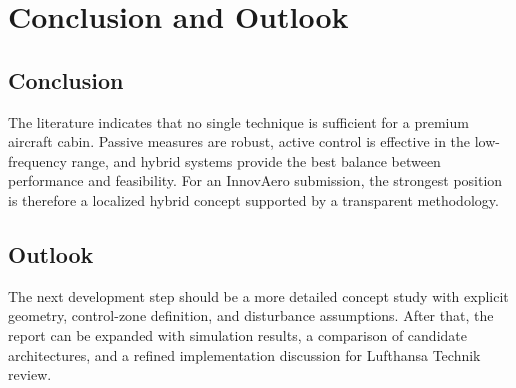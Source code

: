 \chapter{Conclusion and Outlook}

\section{Conclusion}
The literature indicates that no single technique is sufficient for a premium aircraft cabin. Passive measures are robust, active control is effective in the low-frequency range, and hybrid systems provide the best balance between performance and feasibility. For an InnovAero submission, the strongest position is therefore a localized hybrid concept supported by a transparent methodology.

\section{Outlook}
The next development step should be a more detailed concept study with explicit geometry, control-zone definition, and disturbance assumptions. After that, the report can be expanded with simulation results, a comparison of candidate architectures, and a refined implementation discussion for Lufthansa Technik review.
